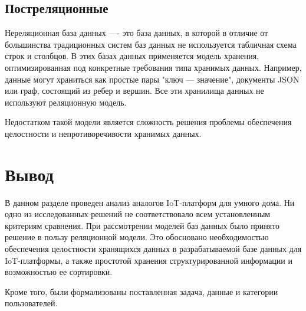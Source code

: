 \subsection{Постреляционные}

Нереляционная база данных —- это база данных, в которой в отличие от большинства традиционных систем баз данных 
не используется табличная схема строк и столбцов. В этих базах данных применяется модель хранения, оптимизированная 
под конкретные требования типа хранимых данных. Например, данные могут храниться как простые пары "ключ — значение", 
документы JSON или граф, состоящий из ребер и вершин. Все эти хранилища данных не используют реляционную модель. 


Недостатком такой модели является сложность решения проблемы обеспечения целостности и непротиворечивости хранимых данных.

\section*{Вывод}

В данном разделе проведен анализ аналогов IoT-платформ для умного дома.
Ни одно из исследованных решений не соответствовало всем установленным критериям сравнения. 
При рассмотрении моделей баз данных было принято решение в пользу реляционной модели. 
Это обосновано необходимостью обеспечения целостности хранящихся данных в разрабатываемой базе данных 
для IoT-платформы, а также простотой хранения структурированной информации и возможностью ее сортировки.

Кроме того, были формализованы поставленная задача, данные и категории пользователей.
